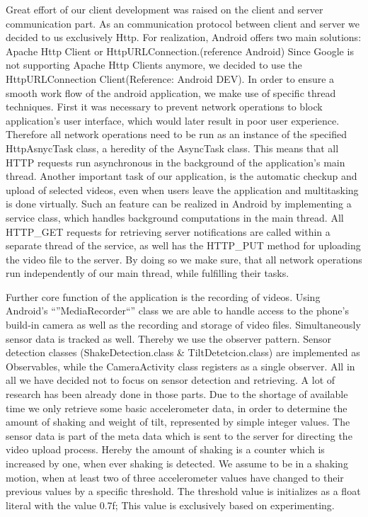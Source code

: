 \documentclass[conference]{IEEEtran}
\begin{document}
Great effort of our client development was raised on the client and server communication part. As an communication protocol between client and server we decided to us exclusively Http. For realization, Android offers two main solutions: Apache Http Client or HttpURLConnection.(reference Android) Since Google is not supporting Apache Http Clients anymore, we decided to use the HttpURLConnection Client(Reference: Android DEV).
In order to ensure a smooth work flow of the android application, we make use of specific thread techniques. First it was necessary to prevent network operations to block application's user interface, which would later result in poor user experience. Therefore all network operations need to be run as an instance of the specified HttpAsnycTask class, a heredity of the AsyncTask class. This means that all HTTP requests run asynchronous in the background of the application's main thread.
Another important task of our application, is the automatic checkup and upload of selected videos, even when users leave the application and multitasking is done virtually. Such an feature can be realized in Android by implementing a service class, which handles background computations in the main thread. All HTTP\_GET requests for retrieving server notifications are called within a separate thread of the service, as well has the HTTP\_PUT method for uploading the video file to the server. By doing so we make sure, that all network operations run independently of our main thread, while fulfilling their tasks.

Further core function of the application is the recording of videos. Using Android's ``''MediaRecorder``'' class we are able to handle access to the phone's build-in camera as well as the recording and storage of video files.
Simultaneously sensor data is tracked as well. Thereby we use the observer pattern. Sensor detection classes (ShakeDetection.class & TiltDetetcion.class) are implemented as Observables, while the CameraActivity class registers as a single observer. All in all we have decided not to focus on sensor detection and retrieving. A lot of research has been already done in those parts. Due to the shortage of available time we only retrieve some basic accelerometer data, in order to determine the amount of shaking and weight of tilt, represented by simple integer values. The sensor data is part of the meta data which is sent to the server for directing the video upload process. Hereby the amount of shaking is a counter which is increased by one, when ever shaking is detected. We assume to be in a shaking motion, when at least two of three accelerometer values have changed to their previous values by a specific threshold. The threshold value is initializes as a float literal with the value 0.7f; This value is exclusively based on experimenting.
\end{document}
